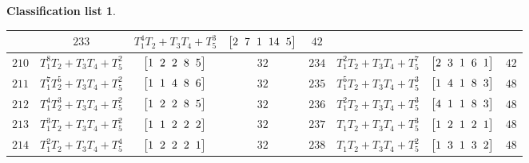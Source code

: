\documentclass[pdftex]{sigma}%
\theoremstyle{definition}
\newtheorem{class-list}[thm]{Classification list}
\numberwithin{equation}{section}
\begin{document}
\begin{class-list}
\begin{table}[t!]
\begin{tabu}{c|c|c|c||c|c|c|c}
&${233}$&${T_{1}^{4}T_{2}+T_{3}T_{4}+T_{5}^{3}}$
&$\arraycolsep=1mm\begin{bmatrix}{2} & {7} & {1} & {14} & {5}\end{bmatrix}$&${42}$
\\ \hline
${210}$&${T_{1}^{8}T_{2}+T_{3}T_{4}+T_{5}^{2}}$
&$\arraycolsep=1mm\begin{bmatrix}{1} & {2} & {2} & {8} & {5}\end{bmatrix}$&${32}$
&${234}$&${T_{1}^{2}T_{2}+T_{3}T_{4}+T_{5}^{7}}$
&$\arraycolsep=1mm\begin{bmatrix}{2} & {3} & {1} & {6} & {1}\end{bmatrix}$&${42}$
\\ \hline
${211}$&${T_{1}^{7}T_{2}^{5}+T_{3}T_{4}+T_{5}^{2}}$
&$\arraycolsep=1mm\begin{bmatrix}{1} & {1} & {4} & {8} & {6}\end{bmatrix}$&${32}$
&${235}$&${T_{1}^{5}T_{2}+T_{3}T_{4}+T_{5}^{3}}$
&$\arraycolsep=1mm\begin{bmatrix}{1} & {4} & {1} & {8} & {3}\end{bmatrix}$&${48}$
\\ \hline
${212}$&${T_{1}^{4}T_{2}^{3}+T_{3}T_{4}+T_{5}^{2}}$
&$\arraycolsep=1mm\begin{bmatrix}{1} & {2} & {2} & {8} & {5}\end{bmatrix}$&${32}$
&${236}$&${T_{1}^{2}T_{2}+T_{3}T_{4}+T_{5}^{3}}$
&$\arraycolsep=1mm\begin{bmatrix}{4} & {1} & {1} & {8} & {3}\end{bmatrix}$&${48}$
\\
\hline
${213}$&${T_{1}^{3}T_{2}+T_{3}T_{4}+T_{5}^{2}}$
&$\arraycolsep=1mm\begin{bmatrix}{1} & {1} & {2} & {2} & {2}\end{bmatrix}$&${32}$
&${237}$&${T_{1}T_{2}+T_{3}T_{4}+T_{5}^{3}}$
&$\arraycolsep=1mm\begin{bmatrix}{1} & {2} & {1} & {2} & {1}\end{bmatrix}$&${48}$
\\
\hline
${214}$&${T_{1}^{2}T_{2}+T_{3}T_{4}+T_{5}^{4}}$
&$\arraycolsep=1mm\begin{bmatrix}{1} & {2} & {2} & {2} & {1}\end{bmatrix}$&${32}$
&${238}$&${T_{1}T_{2}+T_{3}T_{4}+T_{5}^{2}}$
&$\arraycolsep=1mm\begin{bmatrix}{1} & {3} & {1} & {3} & {2}\end{bmatrix}$&${48}$
\\

\end{tabu}
\end{table}
\end{class-list}
\end{document}

